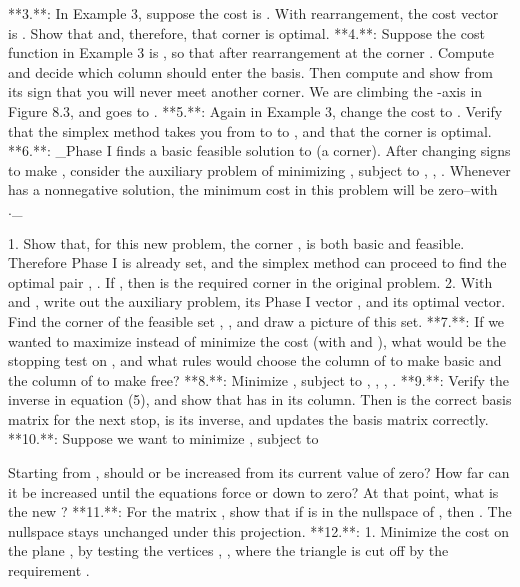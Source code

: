 

**3.**: In Example 3, suppose the cost is . With rearrangement, the cost vector is . Show that and, therefore, that corner is optimal.
**4.**: Suppose the cost function in Example 3 is , so that after rearrangement at the corner . Compute and decide which column should enter the basis. Then compute and show from its sign that you will never meet another corner. We are climbing the -axis in Figure 8.3, and goes to .
**5.**: Again in Example 3, change the cost to . Verify that the simplex method takes you from to to , and that the corner is optimal.
**6.**: _Phase I finds a basic feasible solution to (a corner). After changing signs to make , consider the auxiliary problem of minimizing , subject to , , . Whenever has a nonnegative solution, the minimum cost in this problem will be zero--with ._

1. Show that, for this new problem, the corner , is both basic and feasible. Therefore Phase I is already set, and the simplex method can proceed to find the optimal pair , . If , then is the required corner in the original problem.
2. With and , write out the auxiliary problem, its Phase I vector , and its optimal vector. Find the corner of the feasible set , , and draw a picture of this set.
**7.**: If we wanted to maximize instead of minimize the cost (with and ), what would be the stopping test on , and what rules would choose the column of to make basic and the column of to make free?
**8.**: Minimize , subject to , , , .
**9.**: Verify the inverse in equation (5), and show that has in its column. Then is the correct basis matrix for the next stop, is its inverse, and updates the basis matrix correctly.
**10.**: Suppose we want to minimize , subject to

Starting from , should  or be increased from its current value of zero? How far can it be increased until the equations force or down to zero? At that point, what is the new ?
**11.**: For the matrix , show that if is in the nullspace of , then . The nullspace stays unchanged under this projection.
**12.**:
1. Minimize the cost on the plane , by testing the vertices , , where the triangle is cut off by the requirement .

